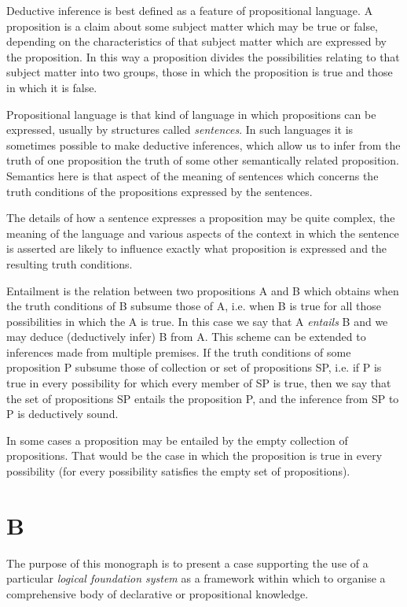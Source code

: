 \documentclass[10pt,titlepage]{book}
\begin{document}
Deductive inference is best defined as a feature of propositional language.
A proposition is a claim about some subject matter which may be true or false, depending on the characteristics of that subject matter which are expressed by the proposition.
In this way a proposition divides the possibilities relating to that subject matter into two groups, those in which the proposition is true and those in which it is false.

Propositional language is that kind of language in which propositions can be expressed, usually by structures called \emph{sentences}.
In such languages it is sometimes possible to make deductive inferences, which allow us to infer from the truth of one proposition the truth of some other semantically related proposition.
Semantics here is that aspect of the meaning of sentences which concerns the truth conditions of the propositions expressed by the sentences.

The details of how a sentence expresses a proposition may be quite complex, the meaning of the language and various aspects of the context in which the sentence is asserted are likely to influence exactly what proposition is expressed and the resulting truth conditions.

Entailment is the relation between two propositions A and B which obtains when the truth conditions of B subsume those of A, i.e. when B is true for all those possibilities in which the A is true.
In this case we say that A \emph{entails} B and we may deduce (deductively infer) B from A.
This scheme can be extended to inferences made from multiple premises.
If the truth conditions of some proposition P subsume those of collection or set of propositions SP, i.e. if P is true in every possibility for which every member of SP is true, then we say that the set of propositions SP entails the proposition P, and the inference from SP to P is deductively sound.

In some cases a proposition may be entailed by the empty collection of propositions.
That would be the case in which the proposition is true in every possibility (for every possibility satisfies the empty set of propositions).

\section{B}

The purpose of this monograph is to present a case supporting the use of a particular \emph{logical foundation system} as a framework within which to organise a comprehensive body of declarative or propositional knowledge.
\end{document}
